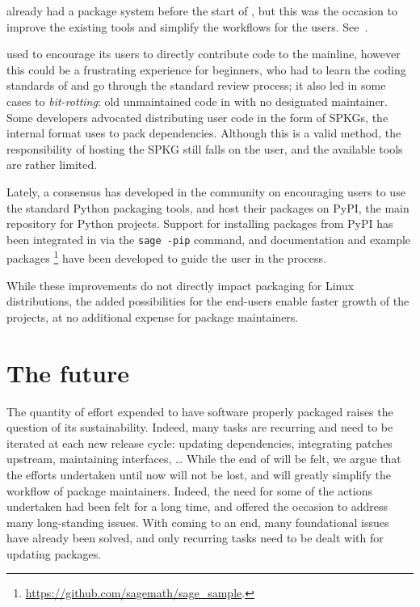 \documentclass{deliverablereport}
\begin{document}
\begin{description}
  \GAP already had a package system before the start of \ODK, but this
  was the occasion to improve the existing tools and simplify the
  workflows for the users. See~.

  \Sage used to encourage its users to directly contribute code to the
  mainline, however this could be a frustrating experience for
  beginners, who had to learn the coding standards of \Sage and go
  through the standard review process; it also led in some cases to
  \emph{bit-rotting}: old unmaintained code in \Sage with no designated
  maintainer. %
  Some \Sage developers advocated distributing user code in the form
  of SPKGs, the internal format \Sage uses to pack dependencies. %
  Although this is a valid method, the responsibility of hosting the
  SPKG still falls on the user, and the available tools are rather
  limited. %
  
  Lately, a consensus has developed in the community on encouraging
  users to use the standard Python packaging tools, and host their
  packages on PyPI, the main repository for Python projects. %
  Support for installing packages from PyPI has been integrated in
  \Sage via the \texttt{sage -pip} command, and documentation and
  example packages%
  \footnote{\url{https://github.com/sagemath/sage_sample}.}%
  have been developed to guide the user in the process.

  While these improvements do not directly impact packaging for Linux
  distributions, the added possibilities for the end-users enable
  faster growth of the projects, at no additional expense for package
  maintainers.
\end{description}

\section{The future}

The quantity of effort expended to have software properly packaged raises
the question of its sustainability. %
Indeed, many tasks are recurring and need to be iterated at each new
release cycle: updating dependencies, integrating patches upstream,
maintaining interfaces, \dots %
While the end of \ODK will be felt, we argue that the efforts undertaken
until now will not be lost, and will greatly simplify the workflow of
package maintainers.  %
Indeed, the need for some of the actions undertaken had been felt for
a long time, and \ODK offered the occasion to address many
long-standing issues. %
With \ODK coming to an end, many foundational issues have already been
solved, and only recurring tasks need to be dealt with for updating
packages.
\end{document}

